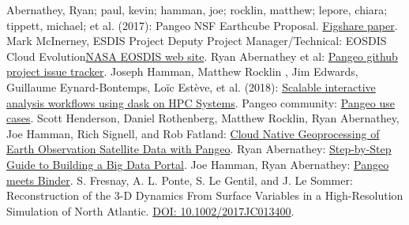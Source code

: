 \documentclass{article}
\begin{document}
\begin{thebibliography}{00}
 Abernathey, Ryan; paul, kevin; hamman, joe; rocklin, matthew; lepore, chiara; tippett, michael; et al. (2017): Pangeo NSF Earthcube Proposal. \href{https://figshare.com/articles/Pangeo_NSF_Earthcube_Proposal/5361094}{Figshare paper}. 
 Mark McInerney, ESDIS Project Deputy Project Manager/Technical: EOSDIS Cloud Evolution\href{https://earthdata.nasa.gov/about/eosdis-cloud-evolution}{NASA EOSDIS web site}. 
 Ryan Abernathey et al: \href{https://github.com/pangeo-data/pangeo/issues}{Pangeo github project issue tracker}. 
  Joseph Hamman, Matthew Rocklin , Jim Edwards, Guillaume Eynard-Bontemps, Loïc Estève, et al. (2018): \href{https://medium.com/pangeo/dask-jobqueue-d7754e42ca53}{Scalable interactive analysis workflows using dask on HPC Systems}. 
  Pangeo community: \href{http://pangeo.io/use_cases/index.html}{Pangeo use cases}. 
 Scott Henderson, Daniel Rothenberg, Matthew Rocklin, Ryan Abernathey, Joe Hamman, Rich Signell, and Rob Fatland: \href{https://medium.com/pangeo/cloud-native-geoprocessing-of-earth-observation-satellite-data-with-pangeo-997692d91ca2}{Cloud Native Geoprocessing of Earth Observation Satellite Data with Pangeo}. 
 Ryan Abernathey: \href{https://medium.com/pangeo/step-by-step-guide-to-building-a-big-data-portal-e262af1c2977}{Step-by-Step Guide to Building a Big Data Portal}.
 Joe Hamman, Ryan Abernathey: \href{https://medium.com/pangeo/pangeo-meets-binder-2ea923feb34f}{Pangeo meets Binder}.
 S. Fresnay, A. L. Ponte, S. Le Gentil, and J. Le Sommer: Reconstruction of the 3-D Dynamics From Surface Variables in
a High-Resolution Simulation of North Atlantic. \href{https://agupubs.onlinelibrary.wiley.com/doi/abs/10.1002/2017JC013400}{DOI: 10.1002/2017JC013400}.
\end{thebibliography}
\end{document}
